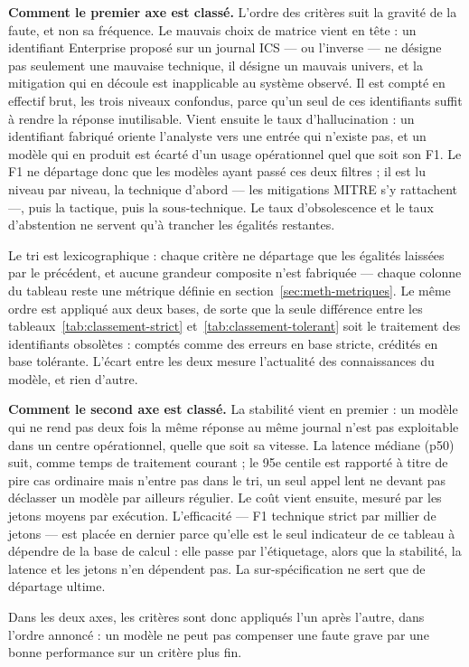 \textbf{Comment le premier axe est classé.} L'ordre des critères suit la gravité de la faute, et non sa fréquence. Le mauvais choix de matrice vient en tête : un identifiant Enterprise proposé sur un journal ICS --- ou l'inverse --- ne désigne pas seulement une mauvaise technique, il désigne un mauvais univers, et la mitigation qui en découle est inapplicable au système observé. Il est compté en effectif brut, les trois niveaux confondus, parce qu'un seul de ces identifiants suffit à rendre la réponse inutilisable. Vient ensuite le taux d'hallucination : un identifiant fabriqué oriente l'analyste vers une entrée qui n'existe pas, et un modèle qui en produit est écarté d'un usage opérationnel quel que soit son F1. Le F1 ne départage donc que les modèles ayant passé ces deux filtres ; il est lu niveau par niveau, la technique d'abord --- les mitigations MITRE s'y rattachent ---, puis la tactique, puis la sous-technique. Le taux d'obsolescence et le taux d'abstention ne servent qu'à trancher les égalités restantes.

Le tri est lexicographique : chaque critère ne départage que les égalités laissées par le précédent, et aucune grandeur composite n'est fabriquée --- chaque colonne du tableau reste une métrique définie en section~\ref{sec:meth-metriques}. Le même ordre est appliqué aux deux bases, de sorte que la seule différence entre les tableaux~\ref{tab:classement-strict} et~\ref{tab:classement-tolerant} soit le traitement des identifiants obsolètes : comptés comme des erreurs en base stricte, crédités en base tolérante. L'écart entre les deux mesure l'actualité des connaissances du modèle, et rien d'autre.

\textbf{Comment le second axe est classé.} La stabilité vient en premier : un modèle qui ne rend pas deux fois la même réponse au même journal n'est pas exploitable dans un centre opérationnel, quelle que soit sa vitesse. La latence médiane (p50) suit, comme temps de traitement courant ; le 95e centile est rapporté à titre de pire cas ordinaire mais n'entre pas dans le tri, un seul appel lent ne devant pas déclasser un modèle par ailleurs régulier. Le coût vient ensuite, mesuré par les jetons moyens par exécution. L'efficacité --- F1 technique strict par millier de jetons --- est placée en dernier parce qu'elle est le seul indicateur de ce tableau à dépendre de la base de calcul : elle passe par l'étiquetage, alors que la stabilité, la latence et les jetons n'en dépendent pas. La sur-spécification ne sert que de départage ultime.

Dans les deux axes, les critères sont donc appliqués l'un après l'autre, dans l'ordre annoncé : un modèle ne peut pas compenser une faute grave par une bonne performance sur un critère plus fin.

